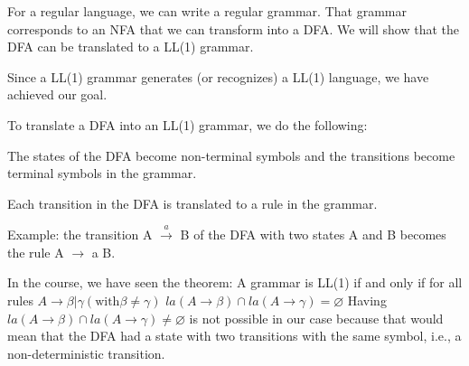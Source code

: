 For a regular language, we can write a regular grammar. That grammar corresponds to an NFA that
we can transform into a DFA. We will show that the DFA can be translated to a LL(1) grammar. 

Since a LL(1) grammar generates (or recognizes) a LL(1) language, we have achieved our goal.

To translate a DFA into an LL(1) grammar, we do the following:

The states of the DFA become non-terminal symbols and the transitions become terminal symbols in
the grammar.

Each transition in the DFA is translated to a rule in the grammar.

Example: the transition A $\xrightarrow{a}$ B of the DFA with two states A and B becomes the rule A $\rightarrow$ a B.

In the course, we have seen the theorem:
A grammar is LL(1) if and only if for all rules $A \rightarrow \beta | \gamma (\text{with} \beta \ne \gamma)$
$la(A \rightarrow \beta) \cap la(A \rightarrow \gamma) = \varnothing$
Having $la(A \rightarrow \beta) \cap la(A \rightarrow \gamma) \ne \varnothing$ is not possible in our case because that would mean that the
DFA had a state with two transitions with the same symbol, i.e., a non-deterministic transition.